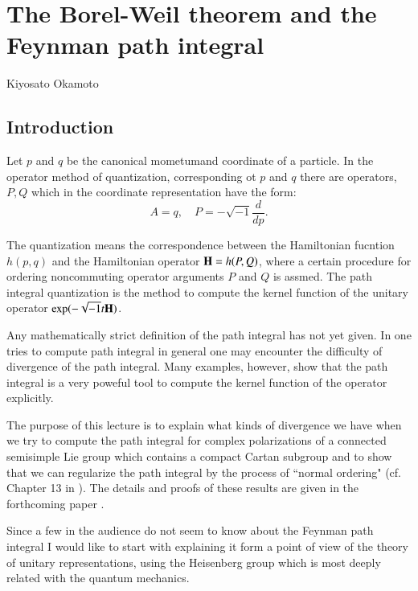 \chapter{The Borel-Weil theorem and the Feynman path integral}\label{chap15}

\begin{center}
Kiyosato Okamoto
\end{center}



\section*{Introduction}

Let $p$ and $q$ be the canonical mometum\pageoriginale and coordinate of a particle. In the operator method of quantization, corresponding ot $p$ and $q$ there are operators, $P, Q$ which in the coordinate representation have the form:
$$
A=q, \quad P=-\sqrt{-1}\dfrac{d}{dp}.
$$

The quantization means the correspondence between the Hamiltonian fucntion $h(p, q)$ and the Hamiltonian operator $\mathbf{H}= h(P, Q)$, where a certain procedure for ordering noncommuting operator arguments $P$ and $Q$ is assmed. The path integral quantization is the method to compute the kernel function of the unitary operator $\exp(-\sqrt{-1}t \mathbf{H})$.

Any mathematically strict definition of the path integral has not yet given. In one tries to compute path integral in general one may encounter the difficulty of divergence of the path integral. Many examples, however, show that the path integral is a very poweful tool to compute the kernel function of the operator explicitly.

The purpose of this lecture is to explain what kinds of divergence we have when we try to compute the path integral for complex polarizations of a connected semisimple Lie group which contains a compact Cartan subgroup and to show that we can regularize the path integral by the process of ``normal ordering" (cf. Chapter 13 in \cite{chap15-key10}). The details and proofs of these results are given in the forthcoming paper \cite{chap15-key7}.

Since a few in the audience do not seem to know about the Feynman path integral I would like to start with explaining it form a point of view of the theory of unitary representations, using the Heisenberg group which is most deeply related with the quantum mechanics.

